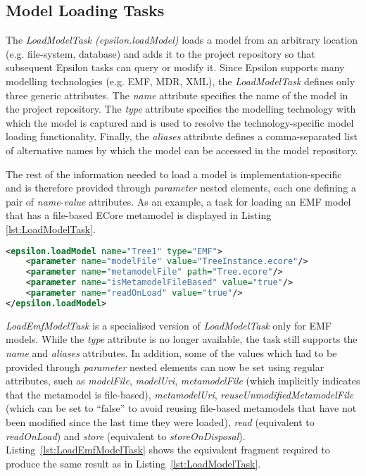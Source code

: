 \subsection{Model Loading Tasks}

The \textit{LoadModelTask (epsilon.loadModel)} loads a model from an arbitrary location (e.g. file-system, database) and adds it to the project repository so that subsequent Epsilon tasks can query or modify it. Since Epsilon supports many modelling technologies (e.g. EMF, MDR, XML), the \textit{LoadModelTask} defines only three generic attributes. The \textit{name} attribute specifies the name of the model in the project repository. The \textit{type} attribute specifies the modelling technology with which the model is captured and is used to resolve the technology-specific model loading functionality. Finally, the \textit{aliases} attribute defines a comma-separated list of alternative names by which the model can be accessed in the model repository.

The rest of the information needed to load a model is implementation-specific and is therefore provided through \textit{parameter} nested elements, each one defining a pair of \textit{name}-\textit{value} attributes. As an example, a task for loading an EMF model that has a file-based ECore metamodel is displayed in Listing \ref{lst:LoadModelTask}.

\begin{lstlisting}[basicstyle=\ttfamily\footnotesize, nolol=true, flexiblecolumns=true, caption=Loading an EMF model using the epsilon.loadModel task, label=lst:LoadModelTask, language=XML]
<epsilon.loadModel name="Tree1" type="EMF">
	<parameter name="modelFile" value="TreeInstance.ecore"/>
	<parameter name="metamodelFile" path="Tree.ecore"/>
	<parameter name="isMetamodelFileBased" value="true"/>
	<parameter name="readOnLoad" value="true"/>
</epsilon.loadModel>
\end{lstlisting}%

\textit{LoadEmfModelTask} is a specialised version of \textit{LoadModelTask} only for EMF models. While the \textit{type} attribute is no longer available, the task still supports the \textit{name} and \textit{aliases} attributes. In addition, some of the values which had to be provided through \textit{parameter} nested elements can now be set using regular attributes, such as \textit{modelFile}, \textit{modelUri}, \textit{metamodelFile} (which implicitly indicates that the metamodel is file-based), \textit{metamodelUri}, \textit{reuseUnmodifiedMetamodelFile} (which can be set to ``false'' to avoid reusing file-based metamodels that have not been modified since the last time they were loaded),  \textit{read} (equivalent to \textit{readOnLoad}) and \textit{store} (equivalent to \textit{storeOnDisposal}). Listing~\ref{lst:LoadEmfModelTask} shows the equivalent fragment required to produce the same result as in Listing~\ref{lst:LoadModelTask}.

